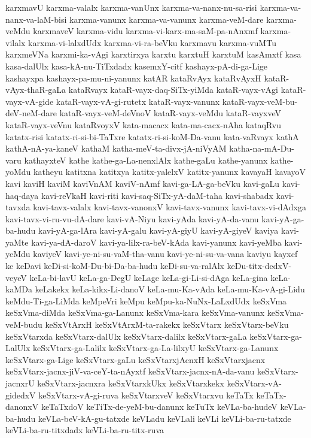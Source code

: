 {karxmavU
karxma-valalx
karxma-vanUnx
karxma-va-nanx-nu-sa-risi
karxma-va-nanx-va-laM-bisi
karxma-vanunx
karxma-va-vanunx
karxma-veM-dare
karxma-veMdu
karxmaveV
karxma-vidu
karxma-vi-karx-ma-saM-pa-nAnxmf
karxma-vilalx
karxma-vi-lalxdUdx
karxma-vi-ra-beVku
karxmavu
karxma-vuMTu
karxmeVNa
karxmi-ka-vAgi
karxtirxya
karxtu
karxtuH
karxtuM
kasAmxtf
kasa
kasa-dalUlx
kasa-kA-nu-TiTxdadx
kasemxY-citf
kashayx-pA-di-ga-Lige
kashayxpa
kashayx-pa-mu-ni-yanunx
katAR
kataRvAyx
kataRvAyxH
kataR-vAyx-thaR-gaLa
kataRvayx
kataR-vayx-daq-SiTx-yiMda
kataR-vayx-vAgi
kataR-vayx-vA-gide
kataR-vayx-vA-gi-rutetx
kataR-vayx-vanunx
kataR-vayx-veM-bu-deV-neM-dare
kataR-vayx-veM-deVnoV
kataR-vayx-veMdu
kataR-vayxveV
kataR-vayx-veVnu
kataRvoyxV
kata-macacx
kata-ma-cacx-nAha
kataqRvu
katatx-risi
katatx-ri-si-bi-TaTxre
katatx-ri-si-koM-Da-vanu
kata-vaRvayx
kathA
kathA-nA-ya-kaneV
kathaM
katha-meV-ta-divx-jA-niVyAM
katha-na-mA-Du-varu
kathayxteV
kathe
kathe-ga-La-nenxlAlx
kathe-gaLu
kathe-yanunx
kathe-yoMdu
katheyu
katitxna
katitxya
katitx-yalelxV
katitx-yanunx
kavayaH
kavayoV
kavi
kaviH
kaviM
kaviVnAM
kaviV-nAmf
kavi-ga-LA-ga-beVku
kavi-gaLu
kavi-haq-daya
kavi-reVkaH
kavi-riti
kavi-saq-SiTx-yA-daM-taha
kavi-shabadx
kavi-tavxda
kavi-tavx-valalx
kavi-tavx-vanonxV
kavi-tavx-vanunx
kavi-tavx-vi-dAdxga
kavi-tavx-vi-ru-vu-dA-dare
kavi-vA-Niyu
kavi-yAda
kavi-yA-da-vanu
kavi-yA-ga-ba-hudu
kavi-yA-ga-lAra
kavi-yA-galu
kavi-yA-giyU
kavi-yA-giyeV
kaviya
kavi-yaMte
kavi-ya-dA-daroV
kavi-ya-lilx-ra-beV-kAda
kavi-yanunx
kavi-yeMba
kavi-yeMdu
kaviyeV
kavi-ye-ni-su-vaM-tha-vanu
kavi-ye-ni-su-va-vana
kaviyu
kayxcf
ke
keDavi
keDi-si-koM-Du-bi-Da-ba-hudu
keDi-su-va-ralAlx
keDu-titx-dedxV-veyeV
keLa-bi-lavU
keLa-ga-DegU
keLage
keLa-gi-Li-si-dAga
keLa-gina
keLa-kaMDa
keLakekx
keLa-kikx-Li-danoV
keLa-mu-Ka-vAda
keLa-mu-Ka-vA-gi-Lidu
keMdu-Ti-ga-LiMda
keMpeVri
keMpu
keMpu-ka-NuNx-LaLxdUdx
keSxVma
keSxVma-diMda
keSxVma-ga-Lanunx
keSxVma-kara
keSxVma-vanunx
keSxVma-veM-budu
keSxVtArxH
keSxVtArxM-ta-rakekx
keSxVtarx
keSxVtarx-beVku
keSxVtarxda
keSxVtarx-dalUlx
keSxVtarx-dalilx
keSxVtarx-gaLa
keSxVtarx-ga-LalUlx
keSxVtarx-ga-Lalilx
keSxVtarx-ga-La-lilxyU
keSxVtarx-ga-Lanunx
keSxVtarx-ga-Lige
keSxVtarx-gaLu
keSxVtarxjAcnxH
keSxVtarxjacnx
keSxVtarx-jacnx-jiV-va-ceY-ta-nAyxtf
keSxVtarx-jacnx-nA-da-vanu
keSxVtarx-jacnxrU
keSxVtarx-jacnxra
keSxVtarxkUkx
keSxVtarxkekx
keSxVtarx-vA-gidedxV
keSxVtarx-vA-gi-ruva
keSxVtarxveV
keSxVtarxvu
keTaTx
keTaTx-danonxV
keTaTxdoV
keTiTx-de-yeM-bu-danunx
keTuTx
keVLa-ba-hudeV
keVLa-ba-hudu
keVLa-beV-kA-gu-tatxde
keVLadu
keVLali
keVLi
keVLi-ba-ru-tatxde
keVLi-ba-ru-titxdadx
keVLi-ba-ru-titx-ruva
}
